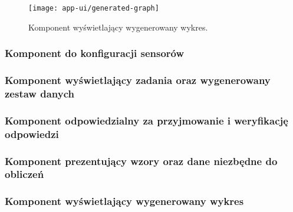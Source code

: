\begin{figure}[!htb]
  \centering
  \texttt{[image: app-ui/generated-graph]}
  \caption{\label{img:generated-graph}Komponent wyświetlający wygenerowany wykres.}
\end{figure}
\endgroup

\subsubsection{Komponent do konfiguracji sensorów}


\subsubsection{Komponent wyświetlający zadania oraz wygenerowany zestaw danych}



\subsubsection{Komponent odpowiedzialny za przyjmowanie i weryfikację odpowiedzi}



\subsubsection{Komponent prezentujący wzory oraz dane niezbędne do obliczeń}



\subsubsection{Komponent wyświetlający wygenerowany wykres}

